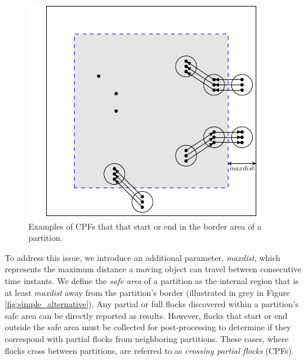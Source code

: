 \begin{figure}
    \centering
    \includegraphics[width=0.5\linewidth]{chapterPFlocks/figures/maxdist.pdf}
    \caption{Examples of CPFs that that start or end in the border area of a partition.}\label{fig:maxdist}
\end{figure}

To address this issue, we introduce an additional parameter, \textit{maxdist}, which represents the maximum distance a moving object can travel between 
consecutive time instants. We define the \textit{safe area} of a partition as the internal region that is at least \textit{maxdist} away from the partition’s 
border (illustrated in grey in Figure \ref{fig:simple_alternative}). Any partial or full flocks discovered within a partition’s safe area can be directly reported as 
results. However, flocks that start or end outside the safe area must be collected for post-processing to determine if they correspond with partial flocks from 
neighboring partitions. These cases, where flocks cross between partitions, are referred to as \textit{crossing partial flocks} (CPFs).


